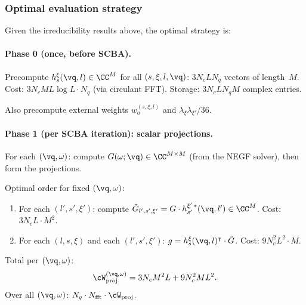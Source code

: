 \subsubsection{Optimal evaluation strategy}
\label{sssub:optimal}

Given the irreducibility results above, the optimal strategy is:

\paragraph{Phase 0 (once, before SCBA).}
Precompute $h_s^\xi(\vq, l) \in \CC^M$ for all
$(s, \xi, l, \vq)$: $3 N_c L N_q$ vectors of length~$M$.
Cost: $3 N_c M L \log L \cdot N_q$ (via circulant FFT).
Storage: $3 N_c L N_q M$ complex entries.

Also precompute external weights $w_a^{(s,\xi,l)}$ and
$\lambda_\xi \lambda_{\xi'} / 36$.

\paragraph{Phase 1 (per SCBA iteration): scalar projections.}
For each $(\vq, \omega)$: compute $G(\omega;\vq) \in \CC^{M \times M}$
(from the NEGF solver), then form the projections.

Optimal order for fixed $(\vq, \omega)$:
\begin{enumerate}
  \item For each $(l', s', \xi')$: compute
    $\tilde{G}_{l',s',\xi'} = G \cdot h_{s'}^{\xi'\,*}(\vq, l')
    \in \CC^M$.
    Cost: $3 N_c L \cdot M^2$.
  \item For each $(l, s, \xi)$ and each $(l', s', \xi')$:
    $g = h_s^{\xi}(\vq, l)^\intercal \cdot \tilde{G}$.
    Cost: $9 N_c^2 L^2 \cdot M$.
\end{enumerate}
Total per $(\vq, \omega)$:
\begin{equation}\label{eq:cost_proj_detail}
  \cW_\mathrm{proj}^{(\vq,\omega)}
  = 3 N_c M^2 L + 9 N_c^2 M L^2.
\end{equation}
Over all $(\vq, \omega)$: $N_q \cdot N_\mathrm{fft} \cdot \cW_\mathrm{proj}$.

